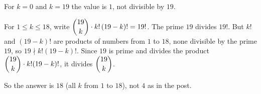 For $k=0$ and $k=19$ the value is $1$, not divisible by $19$.

For $1\le k\le18$, write $\dbinom{19}k\cdot k!\,(19-k)!=19!$. The prime $19$ divides $19!$. But $k!$ and $(19-k)!$ are products of numbers from $1$ to $18$, none divisible by the prime $19$, so $19\nmid k!(19-k)!$. Since $19$ is prime and divides the product $\dbinom{19}k\cdot k!(19-k)!$, it divides $\dbinom{19}{k}$.

So the answer is $\boxed{18}$ (all $k$ from $1$ to $18$), not $4$ as in the post.
